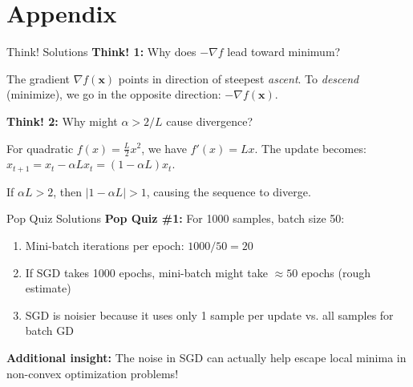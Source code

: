 \documentclass[aspectratio=169,11pt]{beamer}
\newcommand{\grad}{\nabla}
\newcommand{\vx}{\bm{x}}
\begin{document}


\appendix
\section{Appendix}

\begin{frame}{Think! Solutions}
\textbf{Think! 1:} Why does $-\grad f$ lead toward minimum?

The gradient $\grad f(\vx)$ points in direction of steepest \emph{ascent}. To \emph{descend} (minimize), we go in the opposite direction: $-\grad f(\vx)$.

\pause
\vspace{0.5cm}
\textbf{Think! 2:} Why might $\alpha > 2/L$ cause divergence?

For quadratic $f(x) = \frac{L}{2}x^2$, we have $f'(x) = Lx$. 
The update becomes: $x_{t+1} = x_t - \alpha L x_t = (1-\alpha L)x_t$. 

If $\alpha L > 2$, then $|1-\alpha L| > 1$, causing the sequence to diverge.
\end{frame}

\begin{frame}{Pop Quiz Solutions}
\textbf{Pop Quiz \#1:} For 1000 samples, batch size 50:
\begin{enumerate}
\item Mini-batch iterations per epoch: $1000/50 = 20$
\item If SGD takes 1000 epochs, mini-batch might take $\approx 50$ epochs (rough estimate)
\item SGD is noisier because it uses only 1 sample per update vs. all samples for batch GD
\end{enumerate}

\pause
\vspace{0.5cm}
\textbf{Additional insight:} The noise in SGD can actually help escape local minima in non-convex optimization problems!
\end{frame}
\end{document}
